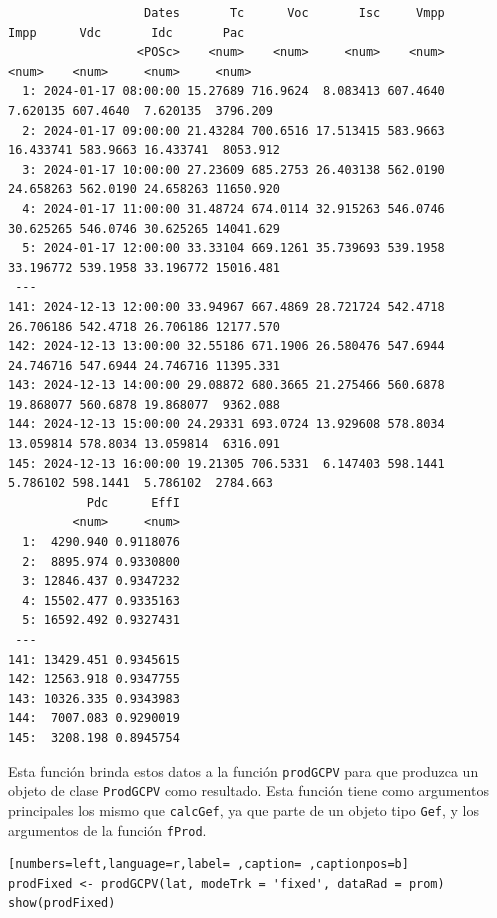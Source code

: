 \begin{verbatim}
                   Dates       Tc      Voc       Isc     Vmpp      Impp      Vdc       Idc       Pac
                  <POSc>    <num>    <num>     <num>    <num>     <num>    <num>     <num>     <num>
  1: 2024-01-17 08:00:00 15.27689 716.9624  8.083413 607.4640  7.620135 607.4640  7.620135  3796.209
  2: 2024-01-17 09:00:00 21.43284 700.6516 17.513415 583.9663 16.433741 583.9663 16.433741  8053.912
  3: 2024-01-17 10:00:00 27.23609 685.2753 26.403138 562.0190 24.658263 562.0190 24.658263 11650.920
  4: 2024-01-17 11:00:00 31.48724 674.0114 32.915263 546.0746 30.625265 546.0746 30.625265 14041.629
  5: 2024-01-17 12:00:00 33.33104 669.1261 35.739693 539.1958 33.196772 539.1958 33.196772 15016.481
 ---                                                                                                
141: 2024-12-13 12:00:00 33.94967 667.4869 28.721724 542.4718 26.706186 542.4718 26.706186 12177.570
142: 2024-12-13 13:00:00 32.55186 671.1906 26.580476 547.6944 24.746716 547.6944 24.746716 11395.331
143: 2024-12-13 14:00:00 29.08872 680.3665 21.275466 560.6878 19.868077 560.6878 19.868077  9362.088
144: 2024-12-13 15:00:00 24.29331 693.0724 13.929608 578.8034 13.059814 578.8034 13.059814  6316.091
145: 2024-12-13 16:00:00 19.21305 706.5331  6.147403 598.1441  5.786102 598.1441  5.786102  2784.663
           Pdc      EffI
         <num>     <num>
  1:  4290.940 0.9118076
  2:  8895.974 0.9330800
  3: 12846.437 0.9347232
  4: 15502.477 0.9335163
  5: 16592.492 0.9327431
 ---                    
141: 13429.451 0.9345615
142: 12563.918 0.9347755
143: 10326.335 0.9343983
144:  7007.083 0.9290019
145:  3208.198 0.8945754
\end{verbatim}

Esta función brinda estos datos a la función \texttt{prodGCPV} para que produzca un objeto de clase \texttt{ProdGCPV} como resultado. Esta función tiene como argumentos principales los mismo que \texttt{calcGef}, ya que parte de un objeto tipo \texttt{Gef}, y los argumentos de la función \texttt{fProd}.
\begin{lstlisting}[numbers=left,language=r,label= ,caption= ,captionpos=b]
prodFixed <- prodGCPV(lat, modeTrk = 'fixed', dataRad = prom)
show(prodFixed)
\end{lstlisting}

